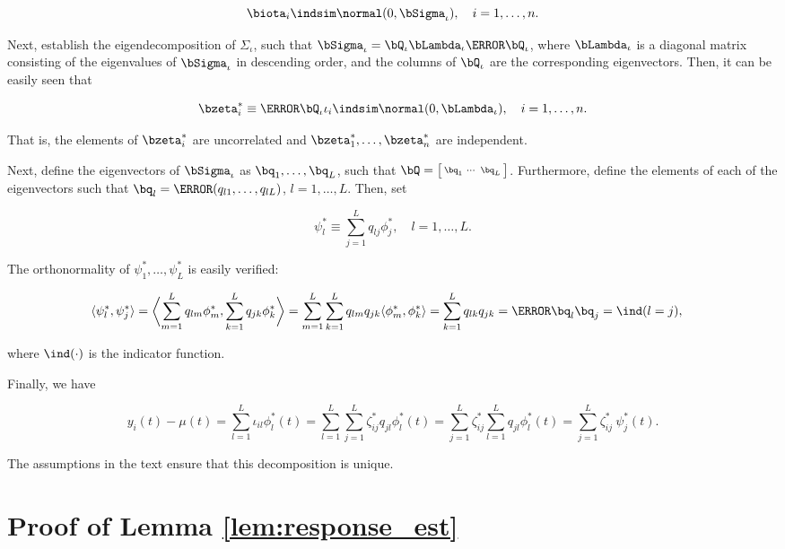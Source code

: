 \documentclass[12pt]{article}
\theoremstyle{plain}
\theoremstyle{definition}
\theoremstyle{remark}
\begin{document}
\[
	\biota_i \indsim \normal (0, \bSigma_\iota), \quad i = 1, \dots, n.
\]

\noindent Next, establish the eigendecomposition of $\Sigma_\iota$, such
that $\bSigma_\iota = \bQ_\iota \bLambda_\iota \T{\bQ_\iota}$, where $\bLambda_\iota$
is a diagonal matrix consisting of the eigenvalues of
$\bSigma_\iota$ in descending order, and the columns of $\bQ_\iota$
are the corresponding eigenvectors. Then, it can be easily seen that

\[
	\bzeta^*_i \equiv \T{\bQ_\iota} \iota_i \indsim \normal (0, \bLambda_\iota), \quad i = 1, \dots, n.
\]

\noindent That is, the elements of $\bzeta^*_i$ are uncorrelated and $\bzeta^*_1, \dots, \bzeta^*_n$ are independent.

Next, define the eigenvectors of $\bSigma_\iota$ as $\bq_1, \dots, \bq_L$, such that $\bQ = \bigl[
\begin{smallmatrix} \bq_1 & \cdots & \bq_L \end{smallmatrix} \bigr]$. Furthermore, define the elements of each of
the eigenvectors such that $\bq_l = \T{( q_{l1}, \dots, q_{lL} )}$, $l = 1, \dots, L$. Then, set

\[
	\psi^*_l \equiv \sum_{j=1}^L q_{lj} \phi^*_j, \quad l = 1, \dots, L.
\]

\noindent The orthonormality of $\psi^*_1, \dots, \psi^*_L$ is easily verified:

\begin{align*}
	\langle \psi^*_l , \psi^*_j \rangle
		&= \biggl\langle \sum_{m=1}^L q_{lm} \phi^*_m , \sum_{k=1}^L q_{jk} \phi^*_k \biggr\rangle
		= \sum_{m=1}^L \sum_{k=1}^L q_{lm} q_{jk} \langle \phi^*_m , \phi^*_k \rangle
		= \sum_{k=1}^L q_{lk} q_{jk}
		= \T{\bq_l} \bq_j
		= \ind (l = j),
\end{align*}

\noindent where $\ind (\cdot)$ is the indicator function.

Finally, we have

\[
	y_i (t) - \mu (t)
		= \sum_{l=1}^L \iota_{il} \phi^*_l (t)
		= \sum_{l=1}^L \sum_{j=1}^L \zeta^*_{ij} q_{jl} \phi^*_l (t)
		= \sum_{j=1}^L \zeta^*_{ij} \sum_{l=1}^L q_{jl} \phi^*_l (t)
		= \sum_{j=1}^L \zeta^*_{ij} \ \psi^*_j (t).
\]

\noindent The assumptions in the text ensure that this decomposition is unique.


\section{Proof of Lemma \ref{lem:response_est}}
\label{app:proof_lem_response_est}
\end{document}
